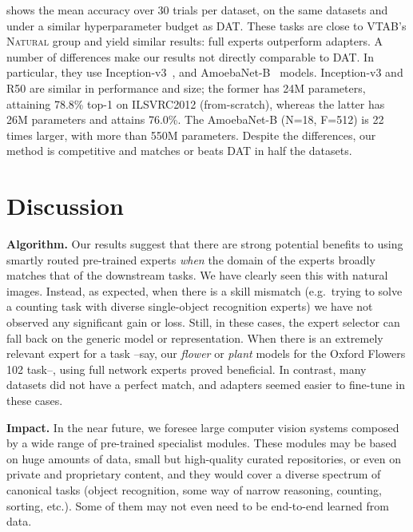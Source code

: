 \documentclass{article}
\begin{document}
 shows the mean accuracy over 30 trials per dataset, on the same datasets and under a similar hyperparameter budget as DAT.
These tasks are close to VTAB's \textsc{Natural} group 
and yield similar results: full experts outperform adapters.
A number of differences make our results not directly comparable to DAT.
In particular, they use Inception-v3~\cite{szegedy2016rethinking}, and AmoebaNet-B~\cite{real2019regularized} models.
Inception-v3 and R50 are similar in performance and size; the former has 24M parameters, attaining 78.8\% top-1 on ILSVRC2012 (from-scratch), whereas the latter has 26M parameters and attains 76.0\%.
The AmoebaNet-B (N=18, F=512) is 22 times larger, with more than 550M parameters.
Despite the differences, our method is competitive and matches or beats DAT in half the datasets.





















 
\vspace{-0.5em}
\section{Discussion}
\textbf{Algorithm.}
Our results suggest that there are strong potential benefits to using smartly routed pre-trained experts \emph{when} the domain of the experts broadly matches that of the downstream tasks.
We have clearly seen this with natural images.
Instead, as expected, when there is a skill mismatch (e.g.\ trying to solve a counting task with diverse single-object recognition experts) we have not observed any significant gain or loss.
Still, in these cases, the expert selector can fall back on the generic model or representation.
When there is an extremely relevant expert for a task --say, our \textit{flower} or \textit{plant} models for the Oxford Flowers 102 task--, using full network experts proved beneficial.
In contrast, many datasets did not have a perfect match, and adapters seemed easier to fine-tune in these cases. 

\textbf{Impact.}
In the near future, we foresee large computer vision systems composed by a wide range of pre-trained specialist modules.
These modules may be based on huge amounts of data, small but high-quality curated repositories, or even on private and proprietary content, and they would cover a diverse spectrum of canonical tasks (object recognition, some way of narrow reasoning, counting, sorting, etc.).
Some of them may not even need to be end-to-end learned from data.
\end{document}
